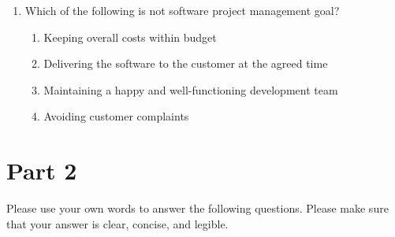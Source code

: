\documentclass{article}
\newcommand{\answeritem}{\global\answertrue\item}
\newcommand{\perhapsanswer}{%
  \ifanswer
    $\blacksquare$ \global\answerfalse
  \else
    $\square$ \global\answerfalse
  \fi
}
\newif\ifanswer
\begin{document}
\begin{enumerate}
    \item Which of the following is not software project management goal?
    \begin{enumerate}[start=1,align=left,label={\protect\perhapsanswer(\alph*)}]
      \item Keeping overall costs within budget
      \item Delivering the software to the customer at the agreed time
      \item Maintaining a happy and well-functioning development team
      \answeritem Avoiding customer complaints
    \end{enumerate}

  \end{enumerate}

  \section*{Part 2} Please use your own words to answer the following questions. Please make sure that your answer is clear, concise, and legible.
\end{document}
